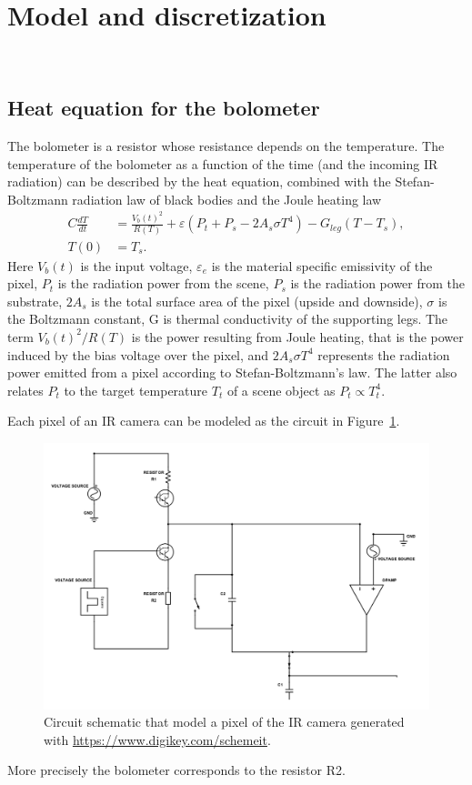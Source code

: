 \section{Model and discretization}~\label{sec:model_disc}

\subsection{Heat equation for the bolometer}

The bolometer is a resistor whose resistance depends on the temperature.
The temperature of the bolometer as a function of the time (and the
incoming IR radiation) can be described by the heat equation, combined
with the Stefan-Boltzmann radiation law of black bodies and the Joule heating law
\begin{align} \label{eq:heat_balance_equation}
 C\frac{dT}{dt}&=\frac{V_b(t)^2}{R(T)}+\varepsilon(P_t+P_s -2A_s \sigma T^4)-G_{leg}(T-T_s), \\
 T(0)&=T_s.	\nonumber
\end{align}
Here $V_b(t)$ is the input voltage, $\varepsilon_e$ is the material
specific emissivity of the pixel, $P_t$ is the radiation power from
the scene, $P_s$ is the radiation power from the substrate, $2A_s$ is
the total surface area of the pixel (upside and downside), $\sigma$ is the Boltzmann constant, G
is thermal conductivity of the supporting legs. The term
$V_b(t)^2/R(T)$ is the power resulting from Joule heating, that is
the power induced by the bias voltage over
the pixel, and $2A_s \sigma T^4$ represents the radiation power
emitted from a pixel according to Stefan-Boltzmann's law. The
latter also relates $P_t$ to the target temperature $T_t$ of a scene
object as $P_t \propto T_t^4$.


Each pixel of an IR camera can be modeled as the circuit in Figure~\ref{fig:circuit}.
\begin{figure}[ht]
 \includegraphics[scale=0.31]{gfx/circuit.png}
\caption{Circuit schematic that model a pixel of the IR camera generated with \url{https://www.digikey.com/schemeit}.}
\label{fig:circuit}
\end{figure}
More precisely the bolometer corresponds to the resistor R2.

